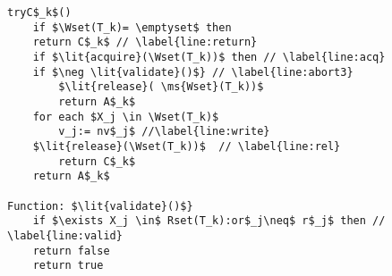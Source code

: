 \begin{algorithm*}[!ht]
\begin{minipage}{0.49\textwidth}
\begin{lstlisting}[frame=none,firstnumber=last,mathescape=true]
tryC$_k$()
    if $\Wset(T_k)= \emptyset$ then
	return C$_k$ // \label{line:return}
    if $\lit{acquire}(\Wset(T_k))$ then	// \label{line:acq}
	if $\neg \lit{validate}()$} // \label{line:abort3}
	    $\lit{release}( \ms{Wset}(T_k))$ 
	    return A$_k$ 
	for each $X_j \in \Wset(T_k)$
	    v_j:= nv$_j$ //\label{line:write}
	$\lit{release}(\Wset(T_k))$  // \label{line:rel}	
	    return C$_k$ 
    return A$_k$ 

Function: $\lit{validate}()$}
    if $\exists X_j \in$ Rset(T_k):or$_j\neq$ r$_j$ then // \label{line:valid}
	return false
    return true

\end{lstlisting}
\end{minipage}
\vspace{-1mm}
\end{algorithm*}



